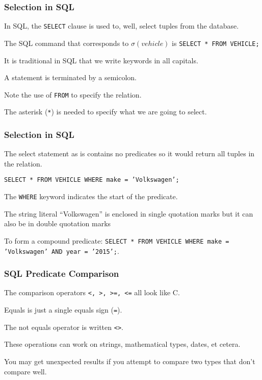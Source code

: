 \begin{frame}
\frametitle{Selection in SQL}

In SQL, the \texttt{SELECT} clause is used to, well, select tuples from the database. 

The SQL command that corresponds to $\sigma( vehicle )$ is \texttt{SELECT * FROM VEHICLE;} 

It is traditional in SQL that we write keywords in all capitals.

A statement is terminated by a semicolon. 

Note the use of \texttt{FROM} to specify the relation. 

The asterisk (\texttt{*}) is needed to specify what we are going to select.
\end{frame}



\begin{frame}
\frametitle{Selection in SQL}

The select statement as is contains no predicates so it would return all tuples in the relation. 

\texttt{SELECT * FROM VEHICLE WHERE make = 'Volkswagen';}

The \texttt{WHERE} keyword indicates the start of the predicate. 

The string literal ``Volkswagen'' is enclosed in single quotation marks but it can also be in double quotation marks  

To form a compound predicate: \texttt{SELECT * FROM VEHICLE WHERE make = 'Volkswagen' AND year = '2015';}. 


\end{frame}



\begin{frame}
\frametitle{SQL Predicate Comparison}

The comparison operators \texttt{<, >, >=, <=} all look like C. 

Equals is just a single equals sign (\texttt{=}). 

The not equals operator is written \texttt{<>}. 

These operations can work on strings, mathematical types, dates, et cetera. 

You may get unexpected results if you attempt to compare two types that don't compare well.

\end{frame}



